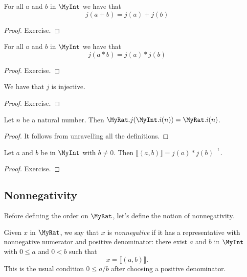 \begin{lemma}
    \label{MyRat.j_add}
    \leanok
For all $a$ and $b$ in $\MyInt$ we have that
\[
j(a+b) = j(a) + j(b)
\]
\end{lemma}
\begin{proof}
    \leanok
Exercise.
\end{proof}

\begin{lemma}
    \label{MyRat.j_mul}
    \leanok
For all $a$ and $b$ in $\MyInt$ we have that
\[
j(a*b) = j(a) * j(b)
\]
\end{lemma}
\begin{proof}
    \leanok
Exercise.
\end{proof}

\begin{lemma}
    \label{MyRat.j_injective}
    \leanok
    We have that $j$ is injective.
\end{lemma}
\begin{proof}
    \leanok
Exercise.
\end{proof}

\begin{lemma}
    \label{MyRat.j_comp_eq_i}
    \leanok
    Let $n$ be a natural number. Then $\MyRat.j (\MyInt.i (n)) = \MyRat.i (n)$.
\end{lemma}
\begin{proof}
    \leanok
It follows from unravelling all the definitions.
\end{proof}

\begin{lemma}
    \label{MyRat.Quotient.mk_def}
    \leanok
    Let $a$ and $b$ be in $\MyInt$ with $b \neq 0$. Then $⟦ (a, b) ⟧ = j(a)*j(b)^{-1}$.
\end{lemma}
\begin{proof}
    \leanok
Exercise.
\end{proof}

\subsection{Nonnegativity}

Before defining the order on $\MyRat$, let's define the notion of nonnegativity.

\begin{definition}
    \label{MyRat.IsNonneg}
    \leanok
Given $x$ in $\MyRat$, we say that $x$ is \emph{nonnegative} if it has a representative with
nonnegative numerator and positive denominator: there exist $a$ and $b$ in $\MyInt$ with
$0 \leq a$ and $0 < b$ such that
\[
x = ⟦(a,b)⟧.
\]
This is the usual condition $0 \leq a/b$ after choosing a positive denominator.
\end{definition}

